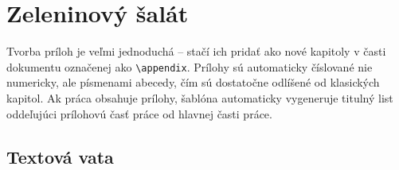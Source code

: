 
\chapter{Zeleninový šalát}

Tvorba príloh je veľmi jednoduchá -- stačí ich pridať ako nové kapitoly v časti dokumentu označenej ako \texttt{{\textbackslash}appendix}. Prílohy sú automaticky číslované nie numericky, ale písmenami abecedy, čím sú dostatočne odlíšené od klasických kapitol. Ak práca obsahuje prílohy, šablóna automaticky vygeneruje titulný list oddeľujúci prílohovú časť práce od hlavnej časti práce.

\section{Textová vata}

\Blindtext
